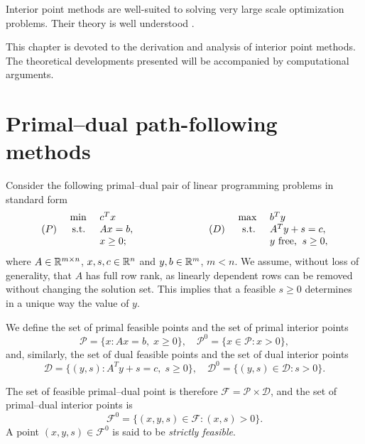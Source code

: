 
%
%
\label{ch:Ipm}

Interior point methods are well-suited to solving very
large scale optimization problems. Their theory is well understood
\cite{ipm:Wright97}.

This chapter is devoted to the derivation and analysis of interior 
point methods. 
The theoretical developments presented will be accompanied by computational 
arguments.


%
%
\section{Primal--dual path-following methods}
\label{sec:Derivation}

Consider the following primal--dual pair of linear programming problems 
in standard form
%
\begin{eqnarray} \label{eq:PrimalDualPair}
  \begin{array}{crlp{2cm}crl}
     & \mbox{ min } & c^T x     &  &     & \mbox{ max }  & b^T y \\
 (P) &\mbox{ s.t. } & Ax = b,   &  & (D) & \mbox{ s.t. } & A^T y + s = c, \\
     &              & x \geq 0; &  &     &   & y \mbox{ free,} \;\; s \geq 0,
  \end{array}
\end{eqnarray}
%
where $A \in \mathbb{R}^{m \times n}$, $x, s, c \in \mathbb{R}^{n}$ 
and $y, b \in \mathbb{R}^{m}$, $m<n$. We assume, without loss of generality,
that $A$ has full row rank, as linearly dependent rows can be
removed without changing the solution set.
This implies that a feasible $s \ge 0$ determines in a unique
way the value of $y$.

We define the set of primal feasible points and the set of
primal interior points 
\[
\mathcal{P} = \{ x : Ax = b, \; x \ge 0 \}, \quad
\mathcal{P}^0 = \{ x \in \mathcal{P} : x > 0 \},
\]
and, similarly, the set of dual feasible points and the set of
dual interior points
\[
\mathcal{D} = \{ (y,s) : A^T y + s = c, \; s \ge 0 \}, \quad
\mathcal{D}^0 = \{ (y,s) \in \mathcal{D} : s > 0 \}.
\]

The set of feasible primal--dual point is therefore
$\mathcal{F} = \mathcal{P} \times \mathcal{D}$, and the set of primal--dual
interior points is
\[
\mathcal{F}^0 = \{ (x,y,s) \in \mathcal{F} : (x,s) > 0 \}.
\]
A point $(x,y,s) \in \mathcal{F}^0$ is said to be {\em strictly feasible}.

